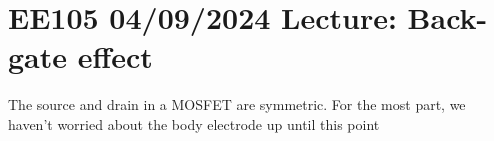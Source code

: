 \section{EE105 04/09/2024 Lecture: Back-gate effect}

The source and drain in a MOSFET are symmetric. For the most part, we haven't worried about the body electrode up until this point

